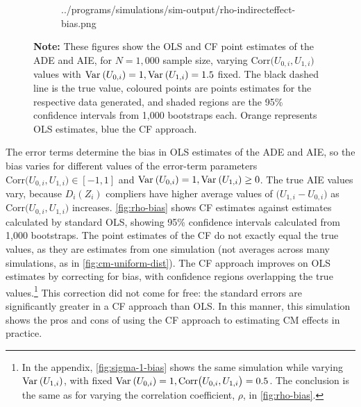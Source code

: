 \begin{figure}[h!]
\begin{subfigure}[c]{0.475\textwidth}
{            ../programs/simulations/sim-output/rho-indirecteffect-bias.png}
    \end{subfigure}
    \label{fig:rho-bias}
    \justify
    \footnotesize    
    \textbf{Note:}
    These figures show the OLS and CF point estimates of the ADE and AIE, for $N = 1,000$ sample size, varying $\text{Corr}\big(U_{0,i}, U_{1,i}\big)$ values with $\text{Var}_{} \left( U_{0,i} \right) = 1, \text{Var}_{} \left( U_{1,i} \right) = 1.5$ fixed.
    The black dashed line is the true value, coloured points are points estimates for the respective data generated, and shaded regions are the 95\% confidence intervals from 1,000 bootstraps each.
    Orange represents OLS estimates, blue the CF approach.
\end{figure}

The error terms determine the bias in OLS estimates of the ADE and AIE, so the bias varies for different values of the error-term parameters $\text{Corr}\big(U_{0,i}, U_{1,i}\big) \in [-1, 1]$ and $\text{Var}_{} \left( U_{0,i} \right) = 1, \text{Var}_{} \left( U_{1,i} \right) \geq 0$.
The true AIE values vary, because $D_i(Z_i)$ compliers have higher average values of $\big(U_{1,i} - U_{0,i}\big)$ as $\text{Corr}\big(U_{0,i}, U_{1,i}\big)$ increases.
\autoref{fig:rho-bias} shows CF estimates against estimates calculated by standard OLS, showing 95\% confidence intervals calculated from 1,000 bootstraps.
The point estimates of the CF do not exactly equal the true values, as they are estimates from one simulation (not averages across many simulations, as in \autoref{fig:cm-uniform-dist}).
The CF approach improves on OLS estimates by correcting for bias, with confidence regions overlapping the true values.\footnote{
    In the appendix, \autoref{fig:sigma-1-bias} shows the same simulation while varying $\text{Var}_{} \left( U_{1,i} \right)$, with fixed $\text{Var}_{} \left( U_{0,i} \right) = 1, \text{Corr}\big(U_{0,i}, U_{1,i}\big) = 0.5$.
    The conclusion is the same as for varying the correlation coefficient, $\rho$, in \autoref{fig:rho-bias}.
}
This correction did not come for free: the standard errors are significantly greater in a CF approach than OLS.
In this manner, this simulation shows the pros and cons of using the CF approach to estimating CM effects in practice.
